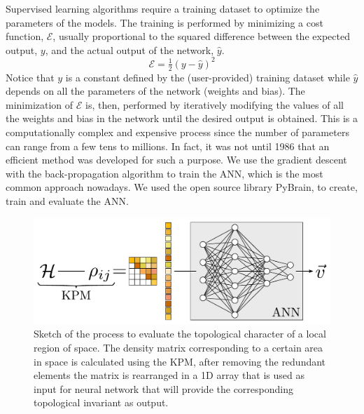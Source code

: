 Supervised learning algorithms require a training dataset to optimize the
parameters of the models. The training is performed by minimizing a cost
function, $\mathcal{E}$, usually proportional to the squared difference between
the expected output, $y$, and the actual output of the network, $\hat{y}$.
\begin{equation}
  \mathcal{E}=\tfrac{1}{2}(y-\hat{y})^2
\end{equation}
Notice that $y$ is a constant defined by the (user-provided) training dataset
while $\hat{y}$ depends on all the parameters of the network (weights and bias).
The minimization of $\mathcal{E}$ is, then, performed by iteratively modifying
the values of all the weights and bias in the network until the desired output
is obtained.
This is a computationally complex and expensive process since the number of
parameters can range from a few tens to millions. In fact, it was not until 1986
that an efficient method was developed for such a purpose.\cite{Rumelhart1986}
We use the gradient descent with the back-propagation algorithm to train the
ANN, which is the most common approach nowadays.
We used the open source library PyBrain,\cite{pybrain} to create, train and evaluate the ANN.



\begin{figure}[t!]
\centering
\includegraphics[width=\columnwidth]{ann/figures/fig2.pdf}
\vspace{-5pt}
\caption{
Sketch of the process to evaluate the topological character of a local region
of space. The density matrix corresponding to a certain area in space is
calculated using the KPM, after removing the redundant elements the matrix is
rearranged in a 1D array that is used as input for neural network that will
provide the corresponding topological invariant as output.
}
\label{fig_method}
\end{figure}



